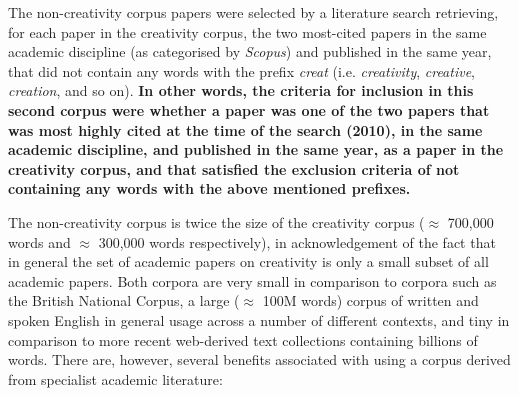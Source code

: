 \documentclass[10pt,letterpaper]{article}
\begin{document}
\vspace{0.25cm}
\begin{center}
\end{center}
\vspace{0.25cm}

The non-creativity corpus papers were selected by a literature search retrieving, for each paper in the creativity corpus, the two most-cited papers in the same academic discipline (as categorised by  {\em Scopus}) and published in the same year, that did not contain any words with the prefix {\em creat\/} (i.e. {\em creativity\/}, {\em creative\/}, {\em creation\/}, and so on). \textbf{In other words, the criteria for inclusion in this second corpus were whether a paper was one of the two papers that was most highly cited at the time of the search (2010), in the same academic discipline, and published in the same year, as a paper in the creativity corpus, and that satisfied the exclusion criteria of not containing any words with the above mentioned prefixes.}


The non-creativity corpus is twice the size of the creativity corpus ($\approx$ 700,000 words and $\approx$ 300,000 words respectively), in acknowledgement of the fact that in general the set of academic papers on creativity is only a small subset of all academic papers. Both corpora are very small in comparison to corpora such as the British National Corpus, a large  ($\approx$ 100M words) corpus of written and spoken English in general usage across a number of different contexts, and tiny in comparison to more recent web-derived text collections containing billions of words. There are, however, several benefits associated with using a corpus derived from specialist academic literature:
\end{document}
